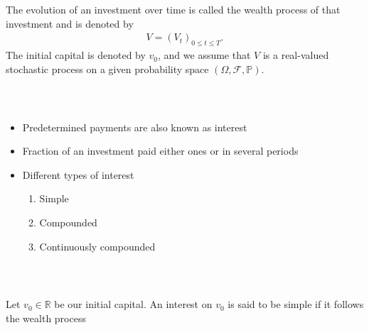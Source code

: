 \documentclass{beamer}
\numberwithin{equation}{section}
\begin{document}
\begin{frame}\frametitle{{\normalsize \secname} \\ {\large \subsecname}}
    \begin{definition}
        The evolution of an investment over time is called the wealth process of that investment and is denoted by
        \begin{align}
            V = (V_t)_{0 \leq t \leq T}.
        \end{align}
        The initial capital is denoted by $v_0$, and we assume that $V$ is a real-valued stochastic process on a given probability space $(\Omega, \mathscr{F}, \mathbb{P})$.
    \end{definition}
\end{frame}

\begin{frame}\frametitle{{\normalsize \secname} \\ {\large \subsecname}}
    \begin{itemize}
        \item Predetermined payments are also known as interest
        \item Fraction of an investment paid either ones or in several periods
        \item Different types of interest
        \begin{enumerate}
            \item Simple
            \item Compounded
            \item Continuously compounded
        \end{enumerate}
    \end{itemize}
\end{frame}

\begin{frame}\frametitle{{\normalsize \secname} \\ {\large \subsecname}}
    \begin{definition}
        Let $v_0 \in \mathbb{R}$ be our initial capital.
        An interest on $v_0$ is said to be simple if it follows the wealth process
        \begin{align}\label{eq:simple_interest_wealth_process}
        \end{align}
    \end{definition}
\end{frame}
\end{document}
